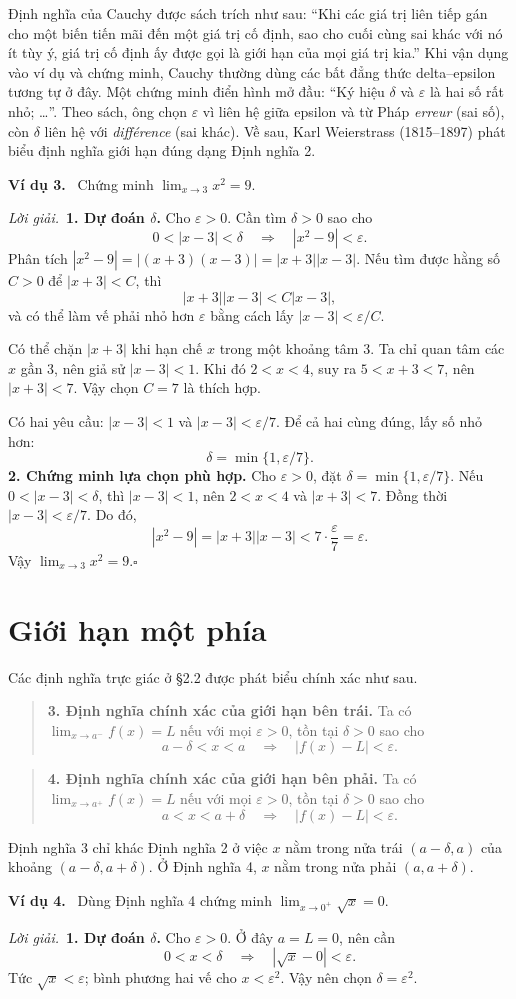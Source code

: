 \documentclass[12pt,a4paper]{article}
\newcommand{\ex}[1]{\par\medskip\noindent\textbf{Ví dụ #1.}\ }
\newcommand{\sol}{\par\noindent\textit{Lời giải.}\ }
\begin{document}
Định nghĩa của Cauchy được sách trích như sau: ``Khi các giá trị liên tiếp gán cho một biến tiến mãi đến một giá trị cố định, sao cho cuối cùng sai khác với nó ít tùy ý, giá trị cố định ấy được gọi là giới hạn của mọi giá trị kia.'' Khi vận dụng vào ví dụ và chứng minh, Cauchy thường dùng các bất đẳng thức delta–epsilon tương tự ở đây. Một chứng minh điển hình mở đầu: ``Ký hiệu $\delta$ và $\varepsilon$ là hai số rất nhỏ; \ldots''. Theo sách, ông chọn $\varepsilon$ vì liên hệ giữa epsilon và từ Pháp \textit{erreur} (sai số), còn $\delta$ liên hệ với \textit{différence} (sai khác). Về sau, Karl Weierstrass (1815–1897) phát biểu định nghĩa giới hạn đúng dạng Định nghĩa 2.
\ex{3} Chứng minh $\lim_{x\to3}x^2=9$.
\sol \textbf{1. Dự đoán $\delta$.} Cho $\varepsilon>0$. Cần tìm $\delta>0$ sao cho
\[0<|x-3|<\delta\quad\Longrightarrow\quad |x^2-9|<\varepsilon.\]
Phân tích $|x^2-9|=|(x+3)(x-3)|=|x+3||x-3|$. Nếu tìm được hằng số $C>0$ để $|x+3|<C$, thì
\[|x+3||x-3|<C|x-3|,\]
và có thể làm vế phải nhỏ hơn $\varepsilon$ bằng cách lấy $|x-3|<\varepsilon/C$.

Có thể chặn $|x+3|$ khi hạn chế $x$ trong một khoảng tâm 3. Ta chỉ quan tâm các $x$ gần 3, nên giả sử $|x-3|<1$. Khi đó $2<x<4$, suy ra $5<x+3<7$, nên $|x+3|<7$. Vậy chọn $C=7$ là thích hợp.

Có hai yêu cầu: $|x-3|<1$ và $|x-3|<\varepsilon/7$. Để cả hai cùng đúng, lấy số nhỏ hơn:
\[\delta=\min\{1,\varepsilon/7\}.\]
\noindent\textbf{2. Chứng minh lựa chọn phù hợp.} Cho $\varepsilon>0$, đặt $\delta=\min\{1,\varepsilon/7\}$. Nếu $0<|x-3|<\delta$, thì $|x-3|<1$, nên $2<x<4$ và $|x+3|<7$. Đồng thời $|x-3|<\varepsilon/7$. Do đó,
\[|x^2-9|=|x+3||x-3|<7\cdot\frac\varepsilon7=\varepsilon.\]
Vậy $\lim_{x\to3}x^2=9$.\hfill$\square$
\section*{Giới hạn một phía}
Các định nghĩa trực giác ở §2.2 được phát biểu chính xác như sau.
\begin{quote}
\textbf{3. Định nghĩa chính xác của giới hạn bên trái.} Ta có $\lim_{x\to a^-}f(x)=L$ nếu với mọi $\varepsilon>0$, tồn tại $\delta>0$ sao cho
\[a-\delta<x<a\quad\Longrightarrow\quad |f(x)-L|<\varepsilon.\]
\end{quote}
\begin{quote}
\textbf{4. Định nghĩa chính xác của giới hạn bên phải.} Ta có $\lim_{x\to a^+}f(x)=L$ nếu với mọi $\varepsilon>0$, tồn tại $\delta>0$ sao cho
\[a<x<a+\delta\quad\Longrightarrow\quad |f(x)-L|<\varepsilon.\]
\end{quote}
Định nghĩa 3 chỉ khác Định nghĩa 2 ở việc $x$ nằm trong nửa trái $(a-\delta,a)$ của khoảng $(a-\delta,a+\delta)$. Ở Định nghĩa 4, $x$ nằm trong nửa phải $(a,a+\delta)$.
\ex{4} Dùng Định nghĩa 4 chứng minh $\lim_{x\to0^+}\sqrt{x}=0$.
\sol \textbf{1. Dự đoán $\delta$.} Cho $\varepsilon>0$. Ở đây $a=L=0$, nên cần
\[0<x<\delta\quad\Longrightarrow\quad |\sqrt{x}-0|<\varepsilon.\]
Tức $\sqrt{x}<\varepsilon$; bình phương hai vế cho $x<\varepsilon^2$. Vậy nên chọn $\delta=\varepsilon^2$.
\end{document}
